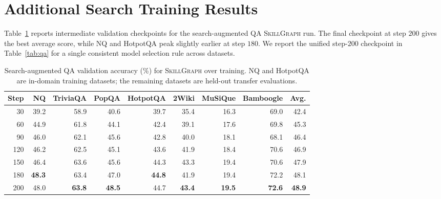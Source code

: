 \section{Additional Search Training Results}
\label{app:search_curve}

Table~\ref{tab:search_curve} reports intermediate validation checkpoints for the search-augmented QA \textsc{SkillGraph} run. The final checkpoint at step $200$ gives the best average score, while NQ and HotpotQA peak slightly earlier at step $180$. We report the unified step-$200$ checkpoint in Table~\ref{tab:qa} for a single consistent model selection rule across datasets.

\begin{table}[h]
    \caption{Search-augmented QA validation accuracy (\%) for \textsc{SkillGraph} over training. NQ and HotpotQA are in-domain training datasets; the remaining datasets are held-out transfer evaluations.}
    \label{tab:search_curve}
    \centering
    \footnotesize
    \setlength{\tabcolsep}{3pt}
    \begin{tabular}{rrrrrrrrr}
    \toprule
    Step & NQ & TriviaQA & PopQA & HotpotQA & 2Wiki & MuSiQue & Bamboogle & Avg. \\
    \midrule
     30 & 39.2 & 58.9 & 40.6 & 39.7 & 35.4 & 16.3 & 69.0 & 42.4 \\
     60 & 44.9 & 61.8 & 44.1 & 42.4 & 39.1 & 17.6 & 69.8 & 45.3 \\
     90 & 46.0 & 62.1 & 45.6 & 42.8 & 40.0 & 18.1 & 68.1 & 46.4 \\
    120 & 46.2 & 62.5 & 45.1 & 43.6 & 41.9 & 18.4 & 70.6 & 46.9 \\
    150 & 46.4 & 63.6 & 45.6 & 44.3 & 43.3 & 19.4 & 70.6 & 47.9 \\
    180 & \textbf{48.3} & 63.4 & 47.0 & \textbf{44.8} & 41.9 & 19.4 & 72.2 & 48.1 \\
    200 & 48.0 & \textbf{63.8} & \textbf{48.5} & 44.7 & \textbf{43.4} & \textbf{19.5} & \textbf{72.6} & \textbf{48.9} \\
    \bottomrule
    \end{tabular}
\end{table}


